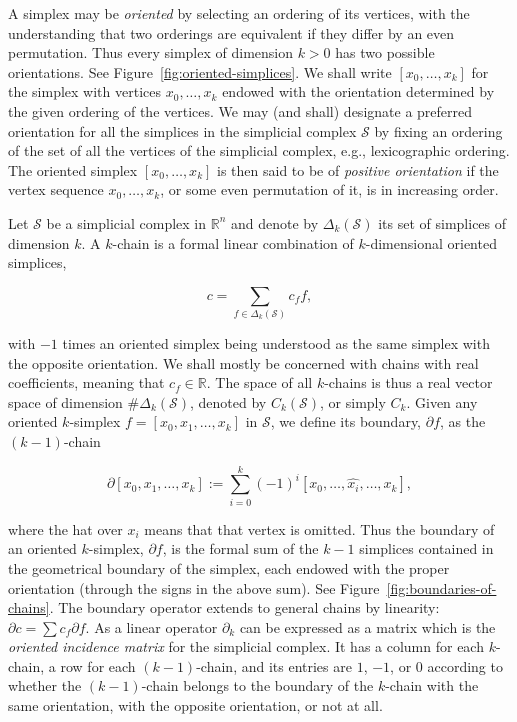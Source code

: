 {A simplex may be \emph{oriented} by selecting an ordering of its vertices, with the understanding that two orderings are equivalent if they differ by an even permutation. Thus every simplex of dimension $k>0$ has two possible orientations. See Figure~\ref{fig:oriented-simplices}. We shall write $[x_0,\ldots,x_k]$ for the simplex with vertices $x_0,\ldots,x_k$ endowed with the orientation determined by the given ordering of the vertices. We may (and shall) designate a preferred orientation for all the simplices in the simplicial complex $\mathcal S$ by fixing an ordering of the set of all the vertices of the simplicial complex, e.g., lexicographic ordering. The oriented simplex $[x_0,\ldots,x_k]$ is then said to be of \emph{positive orientation} if the vertex sequence $x_0,\ldots,x_k$, or some even permutation of it, is in increasing order.}

{Let $\mathcal S$ be a simplicial complex in $\mathbb R^n$ and denote by $\Delta_k(\mathcal S)$ its set of simplices of dimension $k$. A $k$-chain is a formal linear combination of $k$-dimensional oriented simplices,}

\[
c=\sum_{f\in\Delta_k(\mathcal S)}c_f f,
\]

{with $-1$ times an oriented simplex being understood as the same simplex with the opposite orientation. We shall mostly be concerned with chains with real coefficients, meaning that $c_f\in\mathbb R$. The space of all $k$-chains is thus a real vector space of dimension $\#\Delta_k(\mathcal S)$, denoted by $C_k(\mathcal S)$, or simply $C_k$. Given any oriented $k$-simplex $f=[x_0,x_1,\ldots,x_k]$ in $\mathcal S$, we define its boundary, $\partial f$, as the $(k-1)$-chain}

\[
\partial[x_0,x_1,\ldots,x_k]:=\sum_{i=0}^k(-1)^i[x_0,\ldots,\widehat{x_i},\ldots,x_k],
\]

{where the hat over $x_i$ means that that vertex is omitted. Thus the boundary of an oriented $k$-simplex, $\partial f$, is the formal sum of the $k-1$ simplices contained in the geometrical boundary of the simplex, each endowed with the proper orientation (through the signs in the above sum). See Figure~\ref{fig:boundaries-of-chains}. The boundary operator extends to general chains by linearity: $\partial c=\sum c_f\partial f$. As a linear operator $\partial_k$ can be expressed as a matrix which is the \emph{oriented incidence matrix} for the simplicial complex. It has a column for each $k$-chain, a row for each $(k-1)$-chain, and its entries are $1$, $-1$, or $0$ according to whether the $(k-1)$-chain belongs to the boundary of the $k$-chain with the same orientation, with the opposite orientation, or not at all.}

